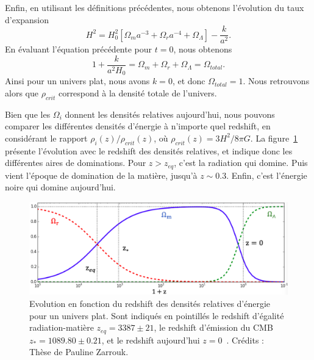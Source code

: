 \documentclass[11pt, twoside, a4paper, openright]{report}
\begin{document}
Enfin, en utilisant les définitions précédentes, nous obtenons l'évolution du taux d'expansion
\begin{equation}
  \label{eq:friedmann7}
  H^2 = H_0^2 \left[\Omega_m a^{-3} + \Omega_r a^{-4} + \Omega_{\Lambda} \right] - \frac{k}{a^{2}} .
\end{equation}
En évaluant l'équation précédente pour $t=0$, nous obtenons
\begin{equation}
  \label{eq:sum_omega}
 1 + \frac{k}{a^{2} H_{0}}  =  \Omega_m + \Omega_r + \Omega_{\Lambda} = \Omega_{total} .
\end{equation}
Ainsi pour un univers plat, nous avons $k = 0$, et donc $\Omega_{total} = 1$. Nous retrouvons alors que $\rho_{crit}$ correspond à la densité totale de l'univers. 

Bien que les $\Omega_i$ donnent les densités relatives aujourd'hui, nous pouvons comparer les différentes densités d'énergie à n'importe quel redshift, en considérant le rapport $\rho_{i}(z) / \rho_{crit}(z)$, où $\rho_{crit}(z) = 3H^{2} / 8 \pi G$. La figure~\ref{fig:evol_omega} présente l'évolution  avec le redshift des densités relatives, et indique donc les différentes aires de dominations. Pour $z > z_{eq}$, c'est la radiation qui domine. Puis vient l'époque de domination de la matière, jusqu'à $z \sim 0.3$. Enfin, c'est l'énergie noire qui domine aujourd'hui.
\begin{figure}
  \centering
  \includegraphics[scale=0.4]{evol_omega}
  \caption{Evolution en fonction du redshift des densités relatives d'énergie pour un univers plat. Sont indiqués en pointillés le redshift d'égalité radiation-matière $z_{eq} = 3387 \pm 21$, le redshift d'émission du CMB $z_{\ast} = 1089.80 \pm 0.21$, et le redshift aujourd'hui $z = 0$~\cite{CITEplanck2018}. Crédits : Thèse de Pauline Zarrouk.}
\label{fig:evol_omega}
\end{figure}
\end{document}
